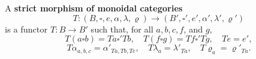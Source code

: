 A \textbf{strict morphism of monoidal categories}
$$T: (B, \square, e, \alpha, \lambda, \varrho) \rightarrow (B', \square', e', \alpha', \lambda', \varrho')$$
is a functor $T: B \rightarrow B'$ such that, for all $a, b, c, f$, and $g$,
$$T(a \square b) = Ta \square' Tb, \quad T(f \square g) = Tf \square' Tg, \quad Te = e',$$
$$T\alpha_{a,b,c} = \alpha'_{Ta,Tb,Tc}, \quad T\lambda_a = \lambda'_{Ta}, \quad T\varrho_a = \varrho'_{Ta}.$$
